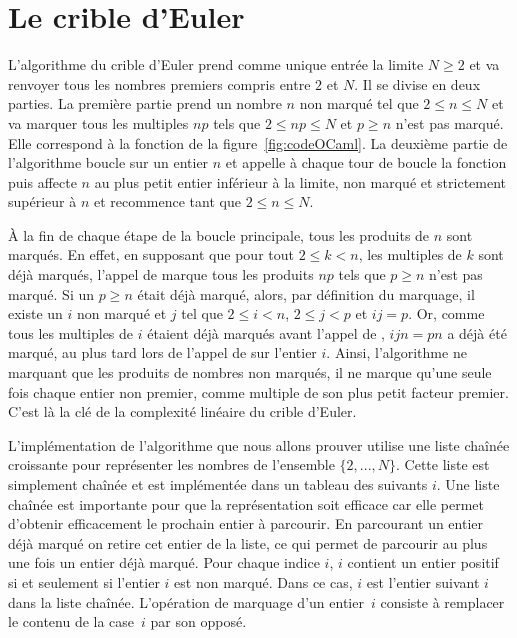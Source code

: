 \documentclass[a4paper]{easychair}
\newcommand\arr[1]{\ocamlf{arr[}#1\ocamlf{]}}
\begin{document}
\section{Le crible d'Euler}
\label{sec:algo}

L'algorithme du crible d'Euler prend comme unique entrée la limite $N \geq 2$ et va
renvoyer tous les nombres premiers compris entre $2$ et $N$. Il se divise en
deux parties. La première partie prend un nombre $n$ non marqué
tel que $2 \leq n \leq N$ et va marquer tous les multiples $np$ tels que
$2 \leq np \leq N$ et $p \geq n$ n'est pas marqué. Elle correspond à la fonction
 de la figure~\ref{fig:codeOCaml}.
La deuxième partie de l'algorithme boucle sur un entier $n$ et appelle à chaque
tour de boucle la fonction  puis affecte $n$ au plus
petit entier inférieur à la limite, non marqué et strictement supérieur à $n$
et recommence tant que $2 \leq n \leq N$.

À la fin de chaque étape de la boucle principale, tous les produits de $n$ sont
marqués. En effet, en supposant que pour tout $2 \leq k < n$, les multiples de $k$
sont déjà marqués, l'appel de  marque tous les produits
$np$ tels que $p \geq n$ n'est pas marqué. Si un $p \geq n$ était déjà marqué,
alors, par définition du marquage, il existe un $i$ non marqué et $j$ tel que
$2 \leq i < n$, $2 \leq j < p$ et $ij = p$. Or, comme tous les multiples de $i$
étaient déjà marqués avant l'appel de , $ijn = pn$
a déjà été marqué, au plus tard lors de l'appel de  sur
l'entier $i$.
Ainsi, l'algorithme ne marquant que les produits de nombres non marqués, il ne
marque qu'une seule fois chaque entier non premier, comme multiple de
son plus petit facteur premier. C'est là la clé de la complexité
linéaire du crible d'Euler.


L'implémentation de l'algorithme que nous allons prouver utilise une liste
chaînée croissante pour représenter les nombres de l'ensemble $\{2,...,N\}$.
Cette liste est simplement chaînée et est implémentée dans un tableau
des suivants \arr{$i$}.
Une liste chaînée est importante pour que la représentation soit efficace
car elle permet d'obtenir efficacement le prochain entier à parcourir.
En parcourant un entier déjà marqué on retire cet entier de la liste,
ce qui permet de parcourir au plus une fois un entier déjà marqué.
Pour chaque indice $i$, \arr{$i$} contient un entier positif
si et seulement si l'entier $i$ est non marqué.
Dans ce cas, \arr{$i$} est l'entier suivant $i$ dans la liste chaînée.
L'opération de marquage d'un entier~$i$ consiste à remplacer le
contenu de la case~$i$ par son opposé.
\end{document}
